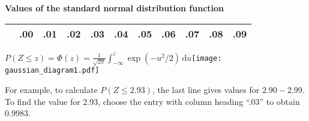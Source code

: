 \documentclass[a4paper]{article}
\begin{document}
\begin{center}
  {\Large\bf Values of the standard normal distribution function}
\end{center}


\pagestyle{empty}
\thispagestyle{empty}
\begin{centering}
\begin{tabular}{r|llllllllll}
  \hline \rule{0mm}{4mm}
  & {\large .00} & {\large .01} & {\large .02} & {\large .03} & {\large .04}
  & {\large .05} & {\large .06} & {\large .07} & {\large .08} & {\large .09}
  \vphantom{$y_{y_{y_y}}$} \\  \hline

  \hline
\end{tabular}
\end{centering}

\noindent
\(\displaystyle P(Z\leqslant z)=\Phi(z)=\frac{1}{\sqrt{2\pi}}\int_{-\infty}^z\exp\left(-u^2/2\right)\,\mathrm{d}u\)\hfill\hbox{\texttt{[image: gaussian\_diagram1.pdf]}}

\noindent For example, to calculate \(P(Z\leqslant 2.93)\), the last
line gives values for \(2.90-2.99\).  To find the value for 2.93,
choose the entry with column heading ``.03'' to obtain 0.9983.

\end{document}
